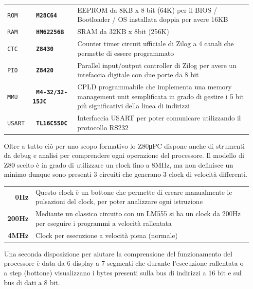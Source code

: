\documentclass[a4paper, 11pt, twoside]{article}
\newcommand{\prj}{Z80μPC\xspace}
\begin{document}
\begin{center}
\begin{tabular}{ >{\tt}l >{\tt\bfseries}l p{.7\linewidth} }
    ROM & M28C64    & EEPROM da 8KB x 8 bit (64K) per il BIOS / Bootloader /
                      OS installata doppia per avere 16KB \\
    RAM & HM62256B  & SRAM da 32KB x 8bit (256K) \\
    CTC & Z8430     & Counter timer circuit ufficiale di Zilog a 4 canali che
                      permette di essere programmato \\
    PIO & Z8420     & Parallel input/output controller di Zilog per avere un
                      intefaccia digitale con due porte da 8 bit \\
    MMU & M4-32/32-15JC & CPLD programmabile che implementa una memory 
                          management unit semplificata in grado di gestire i 5
                          bit pi\`u significativi della linea di indirizzi \\
    USART & TL16C550C & Interfaccia USART per poter comunicare utilizzando il
                        protocollo RS232
\end{tabular}
\end{center}

Oltre a tutto ci\`o per uno scopo formativo lo \prj dispone anche di strumenti
da debug e analisi per comprendere ogni operazione del processore. Il modello
di Z80 scelto \`e in grado di utilizzare un clock fino a 8MHz, ma non
definisce un minimo dunque sono presenti 3 circuiti che generano 3 clock di
velocit\`a differenti.

\begin{center}
\begin{tabular}{ >{\bfseries}r p{.8\linewidth} }
    0Hz     & Questo clock \`e un bottone che permette di creare
              manualmente le pulsazioni del clock, per poter analizzare
              ogni istruzione \\
    200Hz   & Mediante un classico circuito con un LM555 si ha un clock da
              200Hz per eseguire i programmi a velocit\`a rallentata \\
    4MHz    & Clock per esecuzione a velocit\`a piena (normale)
\end{tabular}
\end{center}

Una seconda disposizione per aiutare la comprensione del funzionamento del
processore \`e data da 6 display a 7 segmenti che durante l'esecuzione
rallentata o a step (bottone) visualizzano i bytes presenti sulla bus di
indirizzi a 16 bit e sul bus di dati a 8 bit.
\end{document}

